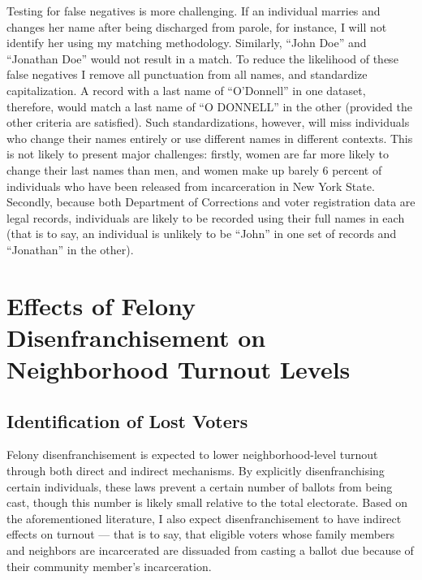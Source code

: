 \documentclass[
  12pt,
]{article}
\begin{document}
Testing for false negatives is more challenging. If an individual marries and changes her name after being discharged from parole, for instance, I will not identify her using my matching methodology. Similarly, ``John Doe'' and ``Jonathan Doe'' would not result in a match. To reduce the likelihood of these false negatives I remove all punctuation from all names, and standardize capitalization. A record with a last name of ``O'Donnell'' in one dataset, therefore, would match a last name of ``O DONNELL'' in the other (provided the other criteria are satisfied). Such standardizations, however, will miss individuals who change their names entirely or use different names in different contexts. This is not likely to present major challenges: firstly, women are far more likely to change their last names than men, and women make up barely 6 percent of individuals who have been released from incarceration in New York State. Secondly, because both Department of Corrections and voter registration data are legal records, individuals are likely to be recorded using their full names in each (that is to say, an individual is unlikely to be ``John'' in one set of records and ``Jonathan'' in the other).

\hypertarget{effects-of-felony-disenfranchisement-on-neighborhood-turnout-levels}{%
\section{Effects of Felony Disenfranchisement on Neighborhood Turnout Levels}\label{effects-of-felony-disenfranchisement-on-neighborhood-turnout-levels}}

\hypertarget{identification-of-lost-voters}{%
\subsection*{Identification of Lost Voters}\label{identification-of-lost-voters}}

Felony disenfranchisement is expected to lower neighborhood-level turnout through both direct and indirect mechanisms. By explicitly disenfranchising certain individuals, these laws prevent a certain number of ballots from being cast, though this number is likely small relative to the total electorate. Based on the aforementioned literature, I also expect disenfranchisement to have indirect effects on turnout --- that is to say, that eligible voters whose family members and neighbors are incarcerated are dissuaded from casting a ballot due because of their community member's incarceration.
\end{document}
